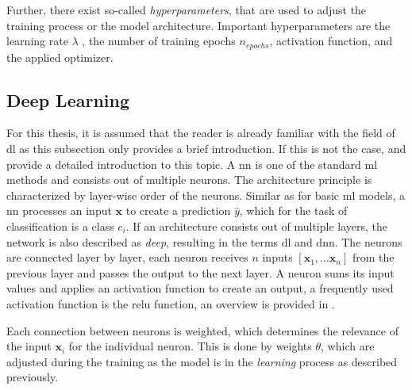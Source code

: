 Further, there exist so-called \textit{hyperparameters}, that are used to adjust the training process or the model architecture.
Important hyperparameters are the learning rate $\lambda$ , the number of training epochs $n_{epochs}$, activation function, and the applied optimizer.


\subsection{Deep Learning}\label{ord:ch2:sec1:subsec2}

For this thesis, it is assumed that the reader is already familiar with the field of \gls{dl} as this subsection only provides a brief introduction. 
If this is not the case, \cite{Goodfellow-et-al-2016} and \cite{Ger17-HandsOn} provide a detailed introduction to this topic.
A \gls{nn} is one of the standard \gls{ml} methods and consists out of multiple neurons.
The architecture principle is characterized by layer-wise order of the neurons.
Similar as for basic \gls{ml} models, a \gls{nn} processes an input $ \textbf{x} $ to create a prediction $ \hat{y} $, which for the task of classification is a class $ c_i $.
If an architecture consists out of multiple layers, the network is also described as \textit{deep}, resulting in the terms \gls{dl} and \gls{dnn}.
The neurons are connected layer by layer, each neuron receives $ n $ inputs $ \left[\textbf{x}_1, \dots \textbf{x}_n \right] $ from the previous layer and passes the output to the next layer.
A neuron sums its input values and applies an activation function to create an output, a frequently used activation function is the \gls{relu} function, an overview is provided in \Cite{SSA20-Activationfunctions}. 

Each connection between neurons is weighted, which determines the relevance of the input $ \textbf{x}_i $ for the individual neuron.
This is done by weights $ \theta $, which are adjusted during the training as the model is in the \textit{learning} process as described previously.

